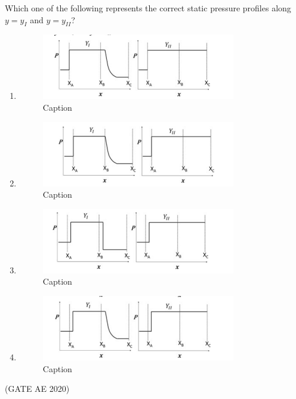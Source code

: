 \documentclass[journal,12pt,onecolumn]{IEEEtran}
\theoremstyle{remark}
\begin{document}
\begin{enumerate}
Which one of the following represents the correct static pressure profiles along $y = y_I$ and $y = y_{II}$?
\begin{enumerate}
  
        \item 
        \begin{figure}[H]
            \centering
            \includegraphics[width=0.5\columnwidth]{figs/Screenshot from 2025-08-18 16-01-49.png}
            \caption{Caption}
            \label{fig:placeholder}
        \end{figure}
        
        \item 
        \begin{figure}[H]
            \centering
            \includegraphics[width=0.5\columnwidth]{figs/Screenshot from 2025-08-18 16-03-56.png}
            \caption{Caption}
            \label{fig:placeholder}
        \end{figure}
        
        \item 
        \begin{figure}[H]
            \centering
            \includegraphics[width=0.5\columnwidth]{figs/Screenshot from 2025-08-18 16-07-16.png}
            \caption{Caption}
            \label{fig:placeholder}
        \end{figure}
        \item 
        \begin{figure}[H]
            \centering
            \includegraphics[width=0.5\columnwidth]{figs/Screenshot from 2025-08-18 16-11-15.png}
            \caption{Caption}
            \label{fig:placeholder}
        \end{figure}
\end{enumerate}
\hfill(GATE AE 2020)


\end{enumerate}
\end{document}
